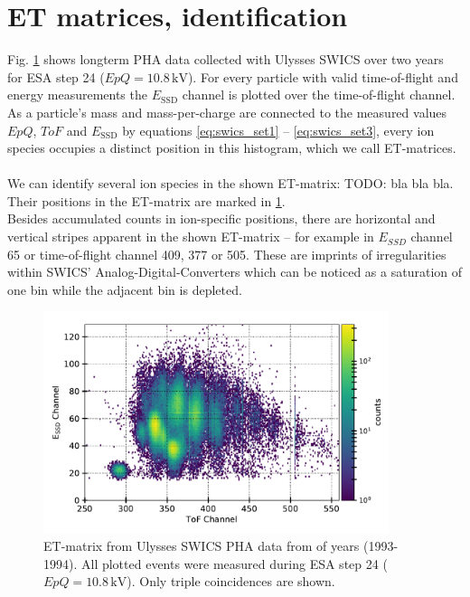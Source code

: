 \section{ET matrices, identification}
\label{sec:etmatrices}
Fig. \ref{fig:et_matrix} shows longterm PHA data collected with Ulysses SWICS over two years for ESA step 24 ($EpQ = 10.8\,\mathrm{kV}$). For every particle with valid time-of-flight and energy measurements the $E_{\mathrm{SSD}}$ channel is plotted over the time-of-flight channel. As a particle's mass and mass-per-charge are connected to the measured values $EpQ$, $ToF$ and $E_{\mathrm{SSD}}$ by equations \ref{eq:swics_set1} --  \ref{eq:swics_set3}, every ion species occupies a distinct position in this histogram, which we call ET-matrices.\\ \\
We can identify several ion species in the shown ET-matrix: TODO: bla bla bla. Their positions in the ET-matrix are marked in \ref{fig:et_matrix}.\\
Besides accumulated counts in ion-specific positions, there are horizontal and vertical stripes apparent in the shown ET-matrix -- for example in $E_{SSD}$ channel 65 or time-of-flight channel 409, 377 or 505. These are imprints of irregularities within SWICS' Analog-Digital-Converters which can be noticed as a saturation of one bin while the adjacent bin is depleted.


\begin{figure}[h]
	\includegraphics[width=0.9\textwidth]{Figures/et_matrix.pdf}
	\centering
	\caption{ET-matrix from Ulysses SWICS PHA data from of years (1993-1994). All plotted events were measured during ESA step 24 ($EpQ = 10.8\,\mathrm{kV}$). Only triple coincidences are shown.}
	\label{fig:et_matrix}
\end{figure}



